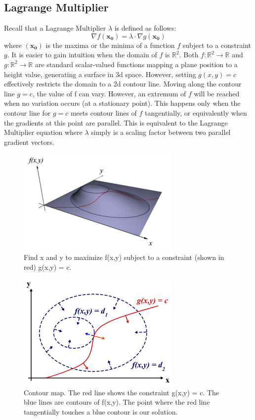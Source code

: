 \documentclass{article}
\begin{document}
\subsection{Lagrange Multiplier}
Recall that a Lagrange Multiplier $\lambda$ is defined as follows:
\begin{equation}
    \nabla f(\mathbf{x_0}) = \lambda \cdot \nabla g(\mathbf{x_0})
\end{equation}
where $(\mathbf{x_0})$ is the maxima or the minima of a function $f$ subject to
a constraint $g$. It is easier to gain intuition when the domain of $f$ is
$\mathbb{R}^2$. Both $f : \mathbb{R}^2 \rightarrow \mathbb{R}$ and $g :
\mathbb{R}^2 \rightarrow \mathbb{R}$ are standard scalar-valued functions
mapping a plane position to a height value, generating a surface in 3d space.
However, setting $g(x,y)=c$ effectively restricts the domain to a 2d contour
line. Moving along the contour line $g=c$, the value of f can vary. However, an
extremum of $f$ will be reached when no variation occurs (at a stationary
point). This happens only when the contour line for $g=c$ meets contour lines of
$f$ tangentially, or equivalently when the gradients at this point are parallel.
This is equivalent to the Lagrange Multiplier equation where $\lambda$ simply is
a scaling factor between two parallel gradient vectors.
\begin{figure}[H]
    \centering
    \includegraphics[scale=0.7]{img/LagrangeMultipliers3D.png}
    \caption{Find x and y to maximize f(x,y) subject to a constraint (shown in red) g(x,y) = c.}
\end{figure}
\begin{figure}[H]
    \centering
    \includegraphics[scale=0.6]{img/LagrangeMultipliers2D.png}
    \caption{Contour map. The red line shows the constraint g(x,y) = c. The blue lines are contours of f(x,y). The point where the red line tangentially touches a blue contour is our solution.}
\end{figure}
\end{document}
